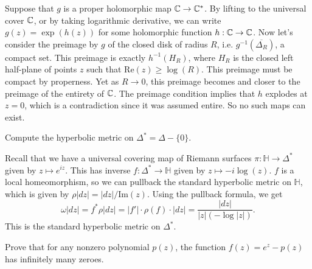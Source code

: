 \documentclass{pset}
\begin{document}
\begin{parts}
  Suppose that $g$ is a proper holomorphic map $\mathbb{C} \to \mathbb{C}^*$. By lifting to the universal cover $\mathbb{C}$, or by taking logarithmic derivative, we can write $g(z) = \exp(h(z))$ for some holomorphic function $h : \mathbb{C} \to \mathbb{C}$. Now let's consider the preimage by $g$ of the closed disk of radius $R$, i.e. $g^{-1}\left(\overline{\Delta_R}\right)$, a compact set. This preimage is exactly $h^{-1}(H_R)$, where $H_R$ is the closed left half-plane of points $z$ such that $\textrm{Re}(z) \geq \log(R)$. This preimage must be compact by properness. Yet as $R \to 0$, this preimage becomes and closer to the preimage of the entirety of $\mathbb{C}$. The preimage condition implies that $h$ explodes at $z=0$, which is a contradiction since it was assumed entire. So no such maps can exist.
\end{parts}

\begin{problem}{2.18}
  Compute the hyperbolic metric on $\Delta^* = \Delta - \{0\}$.
\end{problem}

\begin{solution}
  Recall that we have a universal covering map of Riemann surfaces $\pi : \mathbb{H} \to \Delta^*$ given by $z\mapsto e^{iz}$. This has inverse $f : \Delta^* \to \mathbb{H}$ given by $z\mapsto -i\log(z)$. $f$ is a local homeomorphism, so we can pullback the standard hyperbolic metric on $\mathbb{H}$, which is given by $\rho|dz| = |dz|/\textrm{Im}(z)$. Using the pullback formula, we get
  \[
    \omega|dz| = f^*\rho|dz| = |f'|\cdot \rho(f)\cdot |dz| = \frac{|dz|}{|z|(-\log |z|)}.
  \]
  This is the standard hyperbolic metric on $\Delta^*$.
\end{solution}

\begin{problem}{3.1}
  Prove that for any nonzero polynomial $p(z)$, the function $f(z)=e^z - p(z)$ has infinitely many zeroes. %
\end{problem}
\end{document}
